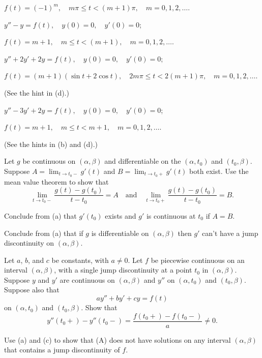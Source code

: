 \begin{exerciselist}
\begin{alist}
$f(t)=(-1)^m,\quad  m\pi\le t<(m+1)\pi,\quad m=0,1,2,\dots$.

\item %
$y''-y=f(t), \quad  y(0)=0,\quad  y'(0)=0$;

$f(t)=m+1,\quad  m\le t<(m+1),\quad m=0,1,2,\dots$.


\item %
$y''+2y'+2y=f(t), \quad  y(0)=0,\quad  y'(0)=0$;

$f(t)=(m+1)(\sin t+2\cos t),\quad  2m\pi\le t<2(m+1)\pi,\quad
m=0,1,2,\dots$.

(See the hint in (d).)

\item %
$y''-3y'+2y=f(t), \quad  y(0)=0,\quad y'(0)=0$;

$f(t)=m+1,\quad  m\le t<m+1,\quad m=0,1,2,\dots$.

 (See the hints in (b) and (d).)
\end{alist}


\item\label{exer:8.5.23}\begin{alist}
\item %
Let $g$ be  continuous on  $(\alpha,\beta)$
 and differentiable on the  $(\alpha,t_0)$
and $(t_0,\beta)$. Suppose $A=\lim_{t\to t_0-}g'(t)$
and $B=\lim_{t\to t_0+}g'(t)$ both exist. Use the mean value theorem
to show that
\[
\lim_{t\to t_0-}\frac{g(t)-g(t_0)}{t-t_0}=A\quad\text{and}\quad
\lim_{t\to t_0+}\frac{g(t)-g(t_0)}{t-t_0}=B.
\]
\item %
Conclude from (a) that $g'(t_0)$ exists and $g'$ is continuous at
$t_0$ if $A=B$.

\item %
Conclude from (a)
 that if $g$  is differentiable on $(\alpha,\beta)$ then
$g'$ can't have a jump discontinuity on $(\alpha,\beta)$.
\end{alist}

\item\label{exer:8.5.24}\begin{alist}
\item %
Let $a$, $b$, and $c$ be constants, with $a\ne0$. Let $f$ be piecewise
continuous on an interval $(\alpha,\beta)$, with a single jump
discontinuity at a point $t_0$ in $(\alpha,\beta)$. Suppose $y$
and $y'$ are continuous on $(\alpha,\beta)$ and $y''$ on
$(\alpha,t_0)$ and $(t_0,\beta)$. Suppose  also that
\[
ay''+by'+cy=f(t)
\tag{A}
\]
on $(\alpha,t_0)$ and $(t_0,\beta)$.
Show that
\[
y''(t_0+)-y''(t_0-)=\frac{f(t_0+)-f(t_0-)}{a}\ne0.
\]
\item %
Use (a) and (c) to show that
(A)
does not  have  solutions on any interval $(\alpha,\beta)$ that contains
a jump discontinuity of $f$.
\end{alist}


\end{exerciselist}
